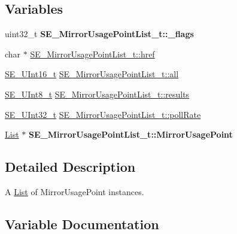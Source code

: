 \subsection*{Variables}
\begin{DoxyCompactItemize}
\item 
\mbox{\label{group__MirrorUsagePointList_ga60049fcd3335ce75cef33ad42abc42f3}} 
uint32\+\_\+t {\bfseries S\+E\+\_\+\+Mirror\+Usage\+Point\+List\+\_\+t\+::\+\_\+flags}
\item 
char $\ast$ \hyperlink{group__MirrorUsagePointList_ga575db02c1e3401b72229b00646a12fba}{S\+E\+\_\+\+Mirror\+Usage\+Point\+List\+\_\+t\+::href}
\item 
\hyperlink{group__UInt16_gac68d541f189538bfd30cfaa712d20d29}{S\+E\+\_\+\+U\+Int16\+\_\+t} \hyperlink{group__MirrorUsagePointList_gac3f1fba94c5ceb565f2ff2eedf3f425d}{S\+E\+\_\+\+Mirror\+Usage\+Point\+List\+\_\+t\+::all}
\item 
\hyperlink{group__UInt8_gaf7c365a1acfe204e3a67c16ed44572f5}{S\+E\+\_\+\+U\+Int8\+\_\+t} \hyperlink{group__MirrorUsagePointList_ga56c6a07daa7b9e0e2a30b9259bdc8f29}{S\+E\+\_\+\+Mirror\+Usage\+Point\+List\+\_\+t\+::results}
\item 
\hyperlink{group__UInt32_ga70bd4ecda3c0c85d20779d685a270cdb}{S\+E\+\_\+\+U\+Int32\+\_\+t} \hyperlink{group__MirrorUsagePointList_ga7b84695ca0e779b95c2b489d3d8257e3}{S\+E\+\_\+\+Mirror\+Usage\+Point\+List\+\_\+t\+::poll\+Rate}
\item 
\mbox{\label{group__MirrorUsagePointList_ga149e9e8d6933eac099e0765ec12e9c6a}} 
\hyperlink{structList}{List} $\ast$ {\bfseries S\+E\+\_\+\+Mirror\+Usage\+Point\+List\+\_\+t\+::\+Mirror\+Usage\+Point}
\end{DoxyCompactItemize}


\subsection{Detailed Description}
A \hyperlink{structList}{List} of Mirror\+Usage\+Point instances. 

\subsection{Variable Documentation}
\mbox{\label{group__MirrorUsagePointList_gac3f1fba94c5ceb565f2ff2eedf3f425d}} 
